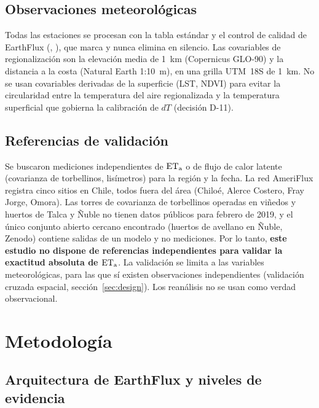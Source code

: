 \subsection{Observaciones meteorológicas}\label{sec:stations}

\StationDataText

Todas las estaciones se procesan con la tabla estándar y el control de
calidad de EarthFlux (, ),
que marca y nunca elimina en silencio. Las covariables de regionalización
son la elevación media de \SI{1}{\kilo\metre} (Copernicus GLO-90) y la
distancia a la costa (Natural Earth 1:10~m), en una grilla UTM~18S de
\SI{1}{\kilo\metre}. No se usan covariables derivadas de la superficie
(LST, NDVI) para evitar la circularidad entre la temperatura del aire
regionalizada y la temperatura superficial que gobierna la calibración de
$dT$ (decisión D-11).

\subsection{Referencias de validación}\label{sec:validation-data}

Se buscaron mediciones independientes de $\mathrm{ET_a}$ o de flujo de calor latente
(covarianza de torbellinos, lisímetros) para la región y la fecha. La red
AmeriFlux registra cinco sitios en Chile, todos fuera del área (Chiloé,
Alerce Costero, Fray Jorge, Omora). Las torres de covarianza de torbellinos
operadas en viñedos y huertos de Talca y Ñuble
\parencite{carrascobenavides2014metric,ortegafarias2010twolayer} no tienen
datos públicos para febrero de 2019, y el único conjunto abierto cercano
encontrado (huertos de avellano en Ñuble, Zenodo) contiene salidas de un
modelo y no mediciones. Por lo tanto, \textbf{este estudio no dispone de
referencias independientes para validar la exactitud absoluta de $\mathrm{ET_a}$}. La
validación se limita a las variables meteorológicas, para las que sí existen
observaciones independientes (validación cruzada espacial,
sección~\ref{sec:design}). Los reanálisis no se usan como verdad
observacional.

\section{Metodología}\label{sec:methods}

\subsection{Arquitectura de EarthFlux y niveles de evidencia}

